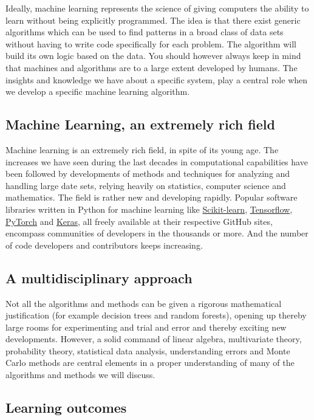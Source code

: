 \documentclass[%
oneside,                 %
final,                   %
10pt]{article}
\begin{document}
Ideally, machine learning represents the science of giving computers
the ability to learn without being explicitly programmed.  The idea is
that there exist generic algorithms which can be used to find patterns
in a broad class of data sets without having to write code
specifically for each problem. The algorithm will build its own logic
based on the data.  You should however always keep in mind that
machines and algorithms are to a large extent developed by humans. The
insights and knowledge we have about a specific system, play a central
role when we develop a specific machine learning algorithm. 

\subsection*{Machine Learning, an extremely rich field}

Machine learning is an extremely rich field, in spite of its young
age. The increases we have seen during the last  decades in
computational capabilities have been followed by developments of
methods and techniques for analyzing and handling large date sets,
relying heavily on statistics, computer science and mathematics.  The
field is rather new and developing rapidly. Popular software libraries
written in Python for machine learning like
\href{{http://scikit-learn.org/stable/}}{Scikit-learn},
\href{{https://www.tensorflow.org/}}{Tensorflow},
\href{{http://pytorch.org/}}{PyTorch} and \href{{https://keras.io/}}{Keras}, all
freely available at their respective GitHub sites, encompass
communities of developers in the thousands or more. And the number of
code developers and contributors keeps increasing.

\subsection*{A multidisciplinary approach}

Not all the
algorithms and methods can be given a rigorous mathematical
justification (for example decision trees and random forests), opening up thereby large rooms for experimenting and
trial and error and thereby exciting new developments.  However, a
solid command of linear algebra, multivariate theory, probability
theory, statistical data analysis, understanding errors and Monte
Carlo methods are central elements in a proper understanding of many
of the algorithms and methods we will discuss.


\subsection*{Learning outcomes}
\end{document}
